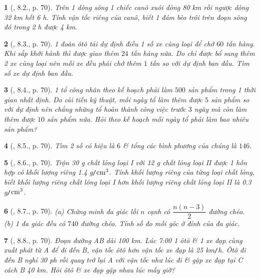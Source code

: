 \documentclass{article}
\newtheorem{baitoan}{}
\begin{document}
\begin{baitoan}[\cite{Binh_boi_duong_Toan_9_tap_2}, 8.2., p. 70]
	Trên 1 dòng sông 1 chiếc canô xuôi dòng {\rm80 km} rồi ngược dòng {\rm32 km} hết {\rm6 h}. Tính vận tốc riêng của canô, biết 1 đám bèo trôi trên đoạn sông đó trong {\rm2 h} được {\rm4 km}.
\end{baitoan}

\begin{baitoan}[\cite{Binh_boi_duong_Toan_9_tap_2}, 8.3., p. 70]
	1 đoàn ôtô tải dự định điều 1 số xe cùng loại để chở $60$ tấn hàng. Khi sắp khởi hành thì được giao thêm $24$ tấn hàng nữa. Do chỉ được bổ sung thêm 2 xe cùng loại nên mỗi xe đều phải chở thêm $1$ tấn so với dự định ban đầu. Tìm số xe dự định ban đầu.
\end{baitoan}

\begin{baitoan}[\cite{Binh_boi_duong_Toan_9_tap_2}, 8.4., p. 70]
	1 tổ công nhân theo kế hoạch phải làm $500$ sản phẩm trong 1 thời gian nhất định. Do cải tiến kỹ thuật, mỗi ngày tổ làm thêm được $5$ sản phẩm so với dự định nên chẳng những tổ hoàn thành công việc trước $3$ ngày mà còn làm thêm được $10$ sản phẩm nữa. Hỏi theo kế hoạch mỗi ngày tổ phải làm bao nhiêu sản phẩm?
\end{baitoan}

\begin{baitoan}[\cite{Binh_boi_duong_Toan_9_tap_2}, 8.5., p. 70]
	Tìm 2 số có hiệu là $6$ \& tổng các bình phương của chúng là $146$.
\end{baitoan}

\begin{baitoan}[\cite{Binh_boi_duong_Toan_9_tap_2}, 8.6., p. 70]
	Trộn {\rm30 g} chất lỏng loại I với {\rm12 g} chất lỏng loại II được 1 hỗn hợp có khối lượng riêng {\rm1.4 g{\tt/}$\rm cm^3$}. Tính khối lượng riêng của từng loại chất lỏng, biết khối lượng riêng chất lỏng loại I hơn khối lượng riêng chất lỏng loại II là {\rm0.3 g{\tt/}$\rm cm^3$}.
\end{baitoan}

\begin{baitoan}[\cite{Binh_boi_duong_Toan_9_tap_2}, 8.7., p. 70]
	(a) Chứng minh đa giác lồi $n$ cạnh có $\dfrac{n(n - 3)}{2}$ đường chéo. (b) 1 đa giác đều có $740$ đường chéo. Tính số đo mỗi góc ở đỉnh của đa giác.
\end{baitoan}

\begin{baitoan}[\cite{Binh_boi_duong_Toan_9_tap_2}, 8.8., p. 70]
	Đoạn đường AB dài {\rm100 km}. Lúc {\rm7:00} 1 ôtô \& 1 xe đạp cùng xuất phát từ A để đi đến B, vận tốc ôtô hơn vận tốc xe đạp là {\rm25 km{\tt/}h}. Ôtô đi đến B nghỉ {\rm30 ph} rồi quay trở lại A với vận tốc như lúc đi \& gặp xe đạp tại C cách B {\rm40 km}. Hỏi ôtô \& xe đạp gặp nhau lúc mấy giờ?
\end{baitoan}
\end{document}
